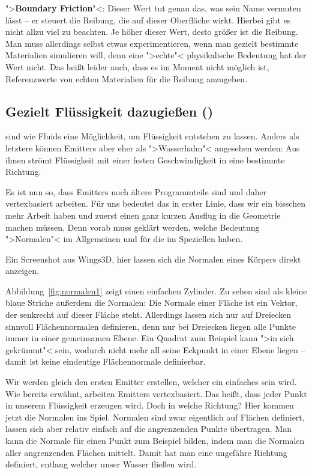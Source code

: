 \documentclass[10pt,DIV=14,a4paper]{scrartcl}
\begin{document}
	\item ">\textbf{Boundary Friction}"<: Dieser Wert tut genau das, was
	sein Name vermuten lässt -- er steuert die Reibung, die auf dieser
	Oberfläche wirkt. Hierbei gibt es nicht allzu viel zu beachten. Je
	höher dieser Wert, desto größer ist die Reibung. Man muss allerdings
	selbst etwas experimentieren, wenn man gezielt bestimmte Materialien
	simulieren will, denn eine ">echte"< physikalische Bedeutung hat der
	Wert nicht. Das heißt leider auch, dass es im Moment nicht möglich
	ist, Referenzwerte von echten Materialien für die Reibung anzugeben.

\itE


\subsection{Gezielt Flüssigkeit dazugießen ()}
 sind wie Fluids eine Möglichkeit, um Flüssigkeit
entstehen zu lassen. Anders als letztere können Emitters aber eher als
">Wasserhahn"< angesehen werden: Aus ihnen strömt Flüssigkeit mit einer
festen Geschwindigkeit in eine bestimmte Richtung.

Es ist nun so, dass Emitters noch ältere Programmteile sind und daher
vertexbasiert arbeiten. Für uns bedeutet das in erster
Linie, dass wir ein bisschen mehr Arbeit haben und zuerst einen ganz
kurzen Ausflug in die Geometrie machen müssen. Denn vorab muss geklärt
werden, welche Bedeutung ">Normalen"< im Allgemeinen und für die
\fluidsim im Speziellen haben.

{Ein Screenshot aus Wings3D, hier lassen sich die Normalen eines Körpers
direkt anzeigen.}

Abbildung~\ref{fig:normalen1} zeigt einen einfachen Zylinder. Zu sehen
sind als kleine blaue Striche außerdem die Normalen: Die Normale einer
Fläche ist ein Vektor, der senkrecht auf dieser Fläche steht. Allerdings
lassen sich nur auf Dreiecken sinnvoll Flächennormalen definieren, denn
nur bei Dreiecken liegen alle Punkte immer in einer gemeinsamen Ebene.
Ein Quadrat zum Beispiel kann ">in sich gekrümmt"< sein, wodurch nicht
mehr all seine Eckpunkt in einer Ebene liegen -- damit ist keine
eindeutige Flächennormale definierbar.

Wir werden gleich den ersten Emitter erstellen, welcher ein einfaches
\TriMesh sein wird. Wie bereits erwähnt, arbeiten Emitters vertexbasiert.
Das heißt, dass jeder Punkt in unserem \TriMesh Flüssigkeit erzeugen
wird. Doch in welche Richtung? Hier kommen jetzt die Normalen ins Spiel.
Normalen sind zwar eigentlich auf Flächen definiert, lassen sich aber
relativ einfach auf die angrenzenden Punkte übertragen. Man kann die
Normale für einen Punkt zum Beispiel bilden, indem man die Normalen
aller angrenzenden Flächen mittelt. Damit hat man eine ungefähre
Richtung definiert, entlang welcher unser Wasser fließen wird.
\end{document}
